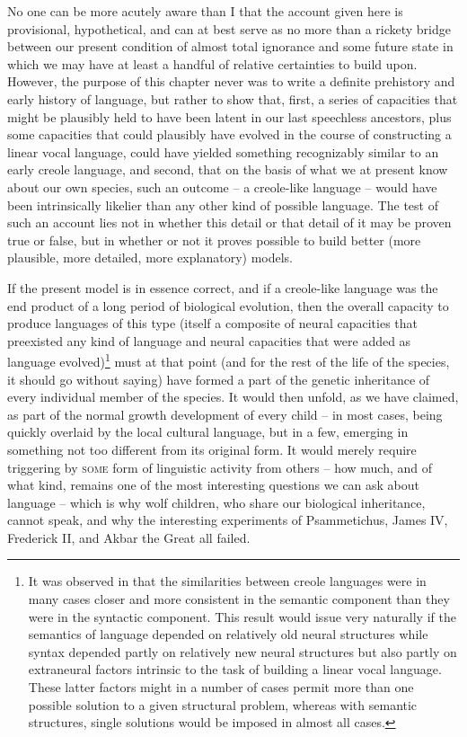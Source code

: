 No one can be more acutely aware than I that the account given here is provisional, hypothetical, and can at best serve as no more than a rickety bridge between our present condition of almost total ignorance and some future state in which we may have at least a handful of relative certainties to build upon. However, the purpose of this chapter never was to write a definite prehistory and early history of language, but rather to show that, first, a series of capacities that might be plausibly held to have been latent in our last speechless ancestors, plus some capacities that could plausibly have evolved in the course of constructing a linear vocal language, could have yielded something recognizably similar to an early creole language, and second, that on the basis of what we at present know about our own species, such an outcome -- a creole-like language -- would have been intrinsically likelier than any other kind of possible language. The test of such an account lies not in whether this detail or that detail of it may be proven true
or false, but in whether or not it proves possible to build better (more plausible, more detailed, more explanatory) models.

If the present model is in essence correct, and if a creole-like language was the end product of a long period of biological evolution, then the overall capacity to produce languages of this type (itself a composite of neural capacities that preexisted any kind of language and neural capacities that were added as language evolved)\footnote{It was observed in  that the similarities between creole languages were in many cases closer and more consistent in the semantic component than they were in the syntactic component. This result would issue very naturally if the semantics of language depended on relatively old neural structures while syntax depended partly on relatively new neural structures but also partly on extraneural factors intrinsic to the task of building a linear vocal language. These latter factors might in a number of cases permit more than one possible solution to a given structural problem, whereas with semantic structures, single solutions would be imposed in almost all cases.} must at that point (and for the rest of the life of the species, it should go without saying) have formed a part of the genetic inheritance of every individual member of the species. It would then unfold, as we have claimed, as part of the normal growth development of every child -- in most cases, being quickly overlaid by the local cultural language, but in a few, emerging in something not too different from its original form. It would merely require triggering by \textsc{some} form of linguistic activity from others -- how much, and of what kind, remains one of the most interesting questions we can ask about language -- which is why wolf children, who share our biological inheritance, cannot speak, and why the interesting experiments of Psammetichus, James IV, Frederick II, and Akbar the Great all failed.

